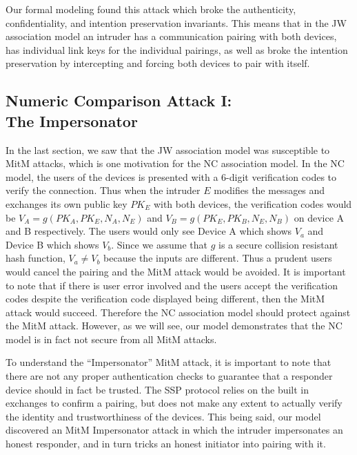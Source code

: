 \documentclass{acm_proc_article-sp}
\begin{document}
Our formal modeling found this attack which broke the authenticity, confidentiality, and intention preservation invariants. This means that in the JW association model an intruder has a communication pairing with both devices, has individual link keys for the individual pairings, as well as broke the intention preservation by intercepting and forcing both devices to pair with itself.

\subsection{Numeric Comparison Attack I:\\The Impersonator} %
In the last section, we saw that the JW association model was susceptible to MitM attacks, which is one motivation for the NC association model. In the NC model, the users of the devices is presented with a 6-digit verification codes to verify the connection. Thus when the intruder $E$ modifies the messages and exchanges its own public key $PK_E$ with both devices, the verification codes would be $V_A = g(PK_A, PK_E, N_A, N_E)$ and $V_B = g(PK_E, PK_B, N_E, N_B)$ on device A and B respectively. The users would only see Device A which shows $V_a$ and Device B which shows $V_b$. Since we assume that $g$ is a secure collision resistant hash function, $V_a \neq V_b$ because the inputs are different. Thus a prudent users would cancel the pairing and the MitM attack would be avoided. It is important to note that if there is user error involved and the users accept the verification codes despite the verification code displayed being different, then the MitM attack would succeed. Therefore the NC association model should protect against the MitM attack. However, as we will see, our model demonstrates that the NC model is in fact not secure from all MitM attacks.

To understand the ``Impersonator'' MitM attack, it is important to note that there are not any proper authentication checks to guarantee that a responder device should in fact be trusted. The SSP protocol relies on the built in exchanges to confirm a pairing, but does not make any extent to actually verify the identity and trustworthiness of the devices. This being said, our model discovered an MitM Impersonator attack in which the intruder impersonates an honest responder, and in turn tricks an honest initiator into pairing with it.
\end{document}
